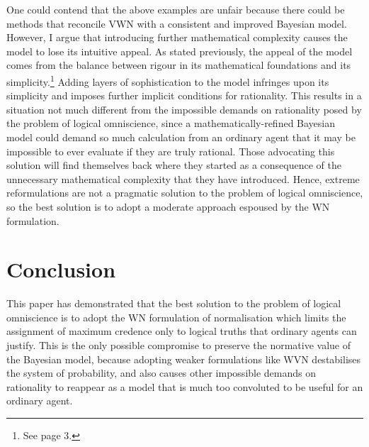 \documentclass[12pt]{article}
\begin{document}
One could contend that the above examples are unfair because there could be methods that reconcile VWN with a consistent and improved Bayesian model. However, I argue that introducing further mathematical complexity causes the model to lose its intuitive appeal. As stated previously, the appeal of the model comes from the balance between rigour in its mathematical foundations and its simplicity.\footnote{See page 3.} Adding layers of sophistication to the model infringes upon its simplicity and imposes further implicit conditions for rationality. This results in a situation not much different from the impossible demands on rationality posed by the problem of logical omniscience, since a mathematically-refined Bayesian model could demand so much calculation from an ordinary agent that it may be impossible to ever evaluate if they are truly rational. Those advocating this solution will find themselves back where they started as a consequence of the unnecessary mathematical complexity that they have introduced. Hence, extreme reformulations are not a pragmatic solution to the problem of logical omniscience, so the best solution is to adopt a moderate approach espoused by the WN formulation.
\section{Conclusion}
This paper has demonstrated that the best solution to the problem of logical omniscience is to adopt the WN formulation of normalisation which limits the assignment of maximum credence only to logical truths that ordinary agents can justify. This is the only possible compromise to preserve the normative value of the Bayesian model, because adopting weaker formulations like WVN destabilises the system of probability, and also causes other impossible demands on rationality to reappear as a model that is much too convoluted to be useful for an ordinary agent.
\pagebreak
\printbibliography
\end{document}
